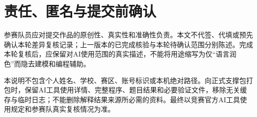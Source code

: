 \documentclass[UTF8,a4paper,zihao=-4,fontset=none]{ctexart}
\begin{document}
\section{责任、匿名与提交前确认}
参赛队员应对提交作品的原创性、真实性和准确性负责。本文不代签、代填或预先确认本轮差异复核记录；上一版本的已完成核验与本轮待确认范围分别陈述。完成本轮复核后，应保留对AI使用范围的真实描述，不能将用途缩写为仅“语言润色”而隐去建模和编程辅助。

本说明不包含个人姓名、学校、赛区、账号标识或本机绝对路径。向正式支撑包打包时，保留AI工具使用详情、完整程序、题目结果和必要验证文件，移除无关缓存与临时日志；不能删除解释结果来源所必需的资料。最终以竞赛官方AI工具使用规定和参赛队真实复核情况为准。
\end{document}
